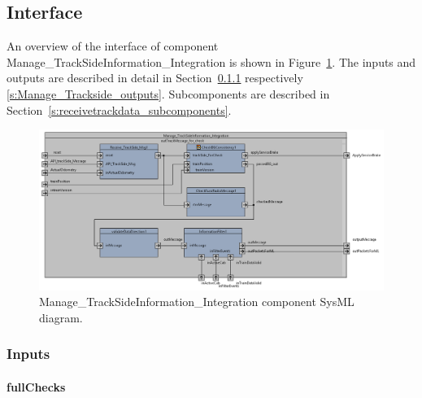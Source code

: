 \subsection{Interface}

An overview of the interface of component Manage\_TrackSideInformation\_Integration is shown in Figure~\ref{f:receiveAndCheckConsistencyArch}. The inputs and outputs are described in detail in Section~\ref{s:Manage_Trackside_inputs} respectively \ref{s:Manage_Trackside_outputs}. Subcomponents are described in Section~\ref{s:receivetrackdata_subcomponents}.

\begin{figure}
\center
\includegraphics[width=\textwidth]{./images/Figure_1_IBD_Manage_TrackSideInformation_Integration_1.png}
\caption{Manage\_TrackSideInformation\_Integration component SysML diagram.}\label{f:receiveAndCheckConsistencyArch}
\end{figure}


\subsubsection{Inputs}\label{s:Manage_Trackside_inputs}

\paragraph{fullChecks}

